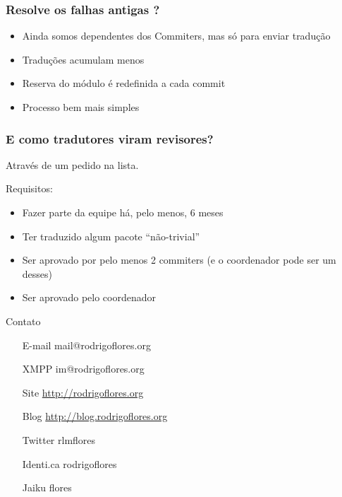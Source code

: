 \documentclass{beamer}
\begin{document}
\begin{frame}
    \frametitle{Resolve os falhas antigas ?}
    \begin{itemize}[<+->]
        \item Ainda somos dependentes dos Commiters, mas só para enviar tradução
        \item Traduções acumulam menos
        \item Reserva do módulo é redefinida a cada commit
        \item Processo bem mais simples
    \end{itemize}
\end{frame}

\begin{frame}
    \frametitle{E como tradutores viram revisores?}
    Através de um pedido na lista.

    Requisitos:
    \begin{itemize}[<+->]
        \item Fazer parte da equipe há, pelo menos, 6 meses
        \item Ter traduzido algum pacote ``não-trivial''
        \item Ser aprovado por pelo menos 2 commiters (e o coordenador pode ser um desses)
        \item Ser aprovado pelo coordenador
    \end{itemize}
\end{frame}

\begin{frame}
    \begin{block}{Contato}     
    \begin{itemize}
            \centering
            \item[E-mail] mail@rodrigoflores.org 
            \item[XMPP]  im@rodrigoflores.org        
            \item[Site]  \url{http://rodrigoflores.org}
            \item[Blog]  \url{http://blog.rodrigoflores.org}        
            \item[Twitter] rlmflores 
            \item[Identi.ca] rodrigoflores        
            \item[Jaiku] flores        
        \end{itemize}
    \end{block}
\end{frame}
\end{document}
